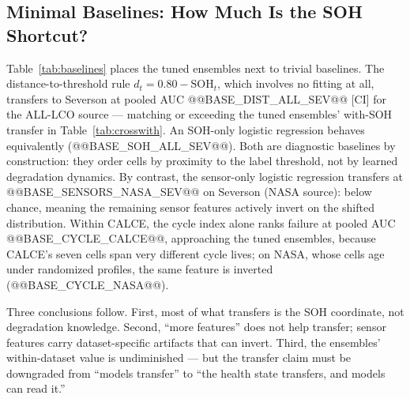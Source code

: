 \subsection{Minimal Baselines: How Much Is the SOH Shortcut?}
Table~\ref{tab:baselines} places the tuned ensembles next to trivial baselines. The distance-to-threshold rule $d_t = 0.80 - \mathrm{SOH}_t$, which involves no fitting at all, transfers to Severson at pooled AUC @@BASE_DIST_ALL_SEV@@ [CI] for the ALL-LCO source --- matching or exceeding the tuned ensembles' with-SOH transfer in Table~\ref{tab:crosswith}. An SOH-only logistic regression behaves equivalently (@@BASE_SOH_ALL_SEV@@). Both are diagnostic baselines by construction: they order cells by proximity to the label threshold, not by learned degradation dynamics. By contrast, the sensor-only logistic regression transfers at @@BASE_SENSORS_NASA_SEV@@ on Severson (NASA source): below chance, meaning the remaining sensor features actively invert on the shifted distribution. Within CALCE, the cycle index alone ranks failure at pooled AUC @@BASE_CYCLE_CALCE@@, approaching the tuned ensembles, because CALCE's seven cells span very different cycle lives; on NASA, whose cells age under randomized profiles, the same feature is inverted (@@BASE_CYCLE_NASA@@).

Three conclusions follow. First, most of what transfers is the SOH coordinate, not degradation knowledge. Second, ``more features'' does not help transfer; sensor features carry dataset-specific artifacts that can invert. Third, the ensembles' within-dataset value is undiminished --- but the transfer claim must be downgraded from ``models transfer'' to ``the health state transfers, and models can read it.''

\begin{table}[!t]
\caption{Minimal Transfer Baselines at H=20: Pooled AUC With Cell-Level Bootstrap 95\% CI. The Distance Rule Is the Unfitted Score $0.80-$SOH.}
\label{tab:baselines}
\centering
{}
\end{table}

